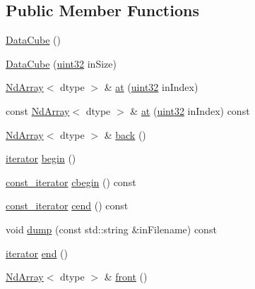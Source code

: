 \subsection*{Public Member Functions}
\begin{DoxyCompactItemize}
\item 
\mbox{\hyperlink{class_num_c_1_1_data_cube_ab60b5ccabf8953eee271f4064d80f708}{Data\+Cube}} ()
\item 
\mbox{\hyperlink{class_num_c_1_1_data_cube_a2582be5bb1e460a945be6170d103eab7}{Data\+Cube}} (\mbox{\hyperlink{namespace_num_c_ae685802ca6d3035f2b400b081e3953fa}{uint32}} in\+Size)
\item 
\mbox{\hyperlink{class_num_c_1_1_nd_array}{Nd\+Array}}$<$ dtype $>$ \& \mbox{\hyperlink{class_num_c_1_1_data_cube_afe1b1ed736d07365f07b92652f484561}{at}} (\mbox{\hyperlink{namespace_num_c_ae685802ca6d3035f2b400b081e3953fa}{uint32}} in\+Index)
\item 
const \mbox{\hyperlink{class_num_c_1_1_nd_array}{Nd\+Array}}$<$ dtype $>$ \& \mbox{\hyperlink{class_num_c_1_1_data_cube_a53b0e0f624cc31c5f9bf403386181a96}{at}} (\mbox{\hyperlink{namespace_num_c_ae685802ca6d3035f2b400b081e3953fa}{uint32}} in\+Index) const
\item 
\mbox{\hyperlink{class_num_c_1_1_nd_array}{Nd\+Array}}$<$ dtype $>$ \& \mbox{\hyperlink{class_num_c_1_1_data_cube_a5ca3940c4aad34665e9d6104a05a6899}{back}} ()
\item 
\mbox{\hyperlink{class_num_c_1_1_data_cube_aa3703e7574db61a4e1ef4b8db93db86a}{iterator}} \mbox{\hyperlink{class_num_c_1_1_data_cube_ab3d0a674028d5aab89d56a2d591ff17e}{begin}} ()
\item 
\mbox{\hyperlink{class_num_c_1_1_data_cube_afb6045a628e0587b3343da1dda12fa03}{const\+\_\+iterator}} \mbox{\hyperlink{class_num_c_1_1_data_cube_a28a7d41b1be694f97b1af279b5afffad}{cbegin}} () const
\item 
\mbox{\hyperlink{class_num_c_1_1_data_cube_afb6045a628e0587b3343da1dda12fa03}{const\+\_\+iterator}} \mbox{\hyperlink{class_num_c_1_1_data_cube_ab218b7c28cb8329292167021c5ca75a0}{cend}} () const
\item 
void \mbox{\hyperlink{class_num_c_1_1_data_cube_ae6c210bb661ece34470af77068862f36}{dump}} (const std\+::string \&in\+Filename) const
\item 
\mbox{\hyperlink{class_num_c_1_1_data_cube_aa3703e7574db61a4e1ef4b8db93db86a}{iterator}} \mbox{\hyperlink{class_num_c_1_1_data_cube_ac80a462829f04d482f44cb38678f9cce}{end}} ()
\item 
\mbox{\hyperlink{class_num_c_1_1_nd_array}{Nd\+Array}}$<$ dtype $>$ \& \mbox{\hyperlink{class_num_c_1_1_data_cube_a6fb33e49146d1fdbdeeff0a42f36749d}{front}} ()

\end{DoxyCompactItemize}
